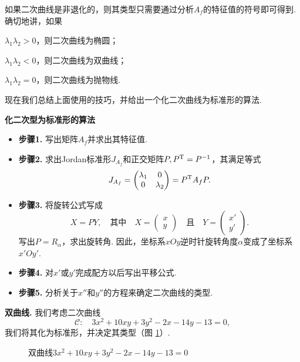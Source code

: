 \begin{remark}
  如果二次曲线是非退化的，则其类型只需要通过分析$A_f$的特征值的符号即可得到. 确切地讲，如果

  $\lambda_1\lambda_2>0$，则二次曲线为椭圆；

  $\lambda_1\lambda_2<0$，则二次曲线为双曲线；

  $\lambda_1\lambda_2=0$，则二次曲线为抛物线.
\end{remark}

现在我们总结上面使用的技巧，并给出一个化二次曲线为标准形的算法.

\begin{mybox}
  {\bfseries 化二次型为标准形的算法}

  \begin{itemize}
    \item {\bfseries 步骤1.} 写出矩阵$A_f$并求出其特征值.
    \item {\bfseries 步骤2.} 求出Jordan标准形$J_{A_f}$和正交矩阵$P,P^{\mathrm T}=P^{-1}$，其满足等式
        \[
          J_{A_f} = \begin{pmatrix}
            \lambda_1 & 0 \\
            0 & \lambda_2
          \end{pmatrix} = P^{\mathrm T} A_fP.
        \]
    \item {\bfseries 步骤3.} 将旋转公式写成
        \[
          X = PY,\quad \text{其中} \quad
          X = \begin{pmatrix}
            x \\
            y
          \end{pmatrix} \quad \text{且} \quad
          Y = \begin{pmatrix}
            x' \\
            y'
          \end{pmatrix}.
        \]
        写出$P=R_\alpha$，求出旋转角. 因此，坐标系$xOy$逆时针旋转角度$\alpha$变成了坐标系$x'Oy'$.
    \item {\bfseries 步骤4.} 对$x'$或$y'$完成配方以后写出平移公式.
    \item {\bfseries 步骤5.} 分析关于$x''$和$y''$的方程来确定二次曲线的类型.
  \end{itemize}
\end{mybox}

\begin{example}
  {\bfseries 双曲线.} 我们考虑二次曲线
  \[
    \mathscr C: \quad 3x^2 + 10xy + 3y^2 - 2x - 14y - 13 = 0,
  \]
  我们将其化为标准形，并决定其类型（图 \ref{fig6.4}）.
\end{example}
\begin{figure}[!ht]
  \centering
  
  \caption{双曲线$3x^2+10xy+3y^2-2x-14y-13=0$}\label{fig6.4}
\end{figure}

